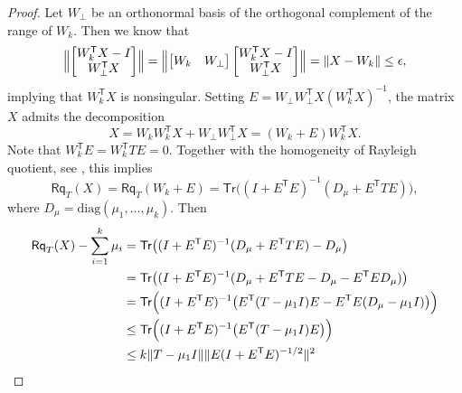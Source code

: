 \documentclass{siamart190516}
\newcommand{\Ttran}{\mathsf{T}}
\newcommand{\Tr}{\mathsf{Tr}}
\newcommand{\Rq}{\mathsf{Rq}}
\providecommand{\diagM}[1]{\mathrm{diag}(#1)}
\providecommand{\norm}[1]{\lVert#1\rVert}
\providecommand{\Bignorm}[1]{\Bigl\lVert#1\Bigr\rVert}
\begin{document}
\begin{proof}
    Let $W_{\perp}$ be an orthonormal basis of the orthogonal complement of the range of $W_{k}$. Then we know that
    \begin{equation}
    \label{eq:nonorthX1}
        \Bignorm{\begin{bmatrix}
            W_{k}^{\Ttran}X-I\\ 
            W_{\perp}^{\Ttran}X
        \end{bmatrix}}=
        \Bignorm{\begin{bmatrix}
            W_{k}&W_{\perp}
        \end{bmatrix}\begin{bmatrix}
            W_{k}^{\Ttran}X-I\\ 
            W_{\perp}^{\Ttran}X
        \end{bmatrix}}
        =\norm{X-W_{k}}\leq \epsilon,
    \end{equation}
    implying that $W_{k}^{\Ttran}X$ is nonsingular.
    Setting $E=W_{\perp}W_{\perp}^{\Ttran}X(W_{k}^{\Ttran}X)^{-1}$, the matrix $X$ admits the decomposition 
    \begin{equation*}
        X = W_{k}W_{k}^{\Ttran}X+W_{\perp}W_{\perp}^{\Ttran}X = (W_{k}+E)W_{k}^{\Ttran}X.
    \end{equation*}
    Note that $W_{k}^{\Ttran} E = W_{k}^{\Ttran} T E  = 0$.
Together with the homogeneity of Rayleigh quotient, see \cite[Prop.~4.1]{absil2002grassmann}, this implies
    \begin{equation*}
        \Rq_{T}(X) = \Rq_{T}(W_{k}+E) = \Tr\bigl((I+E^{\Ttran}E)^{-1}(D_{\mu}+E^{\Ttran}TE)\bigr),
    \end{equation*} 
    where $D_{\mu}=\diagM{\mu_{1},\dotsc,\mu_{k}}$.
    Then
    \begin{equation*}
        \begin{aligned}
            \Rq_{T}(X)-\sum_{i=1}^{k}\mu_{i} 
            &= \Tr\bigl((I+E^{\Ttran}E)^{-1}(D_{\mu}+E^{\Ttran}TE)-D_{\mu}\bigr)\\
            &= \Tr\bigl((I+E^{\Ttran}E)^{-1}(D_{\mu}+E^{\Ttran}TE-D_{\mu}-E^{\Ttran}ED_{\mu})\bigr)\\ 
            &= \Tr\Bigl((I+E^{\Ttran}E)^{-1}\bigl(E^{\Ttran}(T-\mu_{1}I)E-E^{\Ttran}E(D_{\mu}-\mu_{1}I)\bigr)\Bigr)\\ 
            &\leq \Tr\Bigl((I+E^{\Ttran}E)^{-1}\bigl(E^{\Ttran}(T-\mu_{1}I)E\bigr)\Bigr)\\
            &\leq k\norm{T-\mu_{1}I}\norm{E(I+E^{\Ttran}E)^{-1/2}}^{2}\\ 

\end{aligned}
\end{equation*}
\end{proof}
\end{document}
